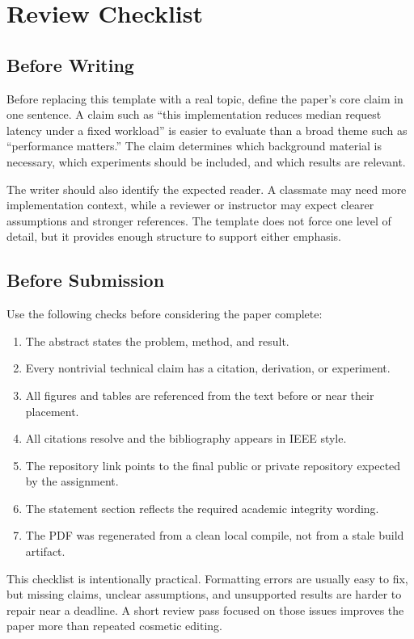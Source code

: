 \section{Review Checklist}

\subsection{Before Writing}

Before replacing this template with a real topic, define the paper's core claim in one sentence. A claim such as ``this implementation reduces median request latency under a fixed workload'' is easier to evaluate than a broad theme such as ``performance matters.'' The claim determines which background material is necessary, which experiments should be included, and which results are relevant.

The writer should also identify the expected reader. A classmate may need more implementation context, while a reviewer or instructor may expect clearer assumptions and stronger references. The template does not force one level of detail, but it provides enough structure to support either emphasis.

\subsection{Before Submission}

Use the following checks before considering the paper complete:
\begin{enumerate}
\item The abstract states the problem, method, and result.
\item Every nontrivial technical claim has a citation, derivation, or experiment.
\item All figures and tables are referenced from the text before or near their placement.
\item All citations resolve and the bibliography appears in IEEE style.
\item The repository link points to the final public or private repository expected by the assignment.
\item The statement section reflects the required academic integrity wording.
\item The PDF was regenerated from a clean local compile, not from a stale build artifact.
\end{enumerate}

This checklist is intentionally practical. Formatting errors are usually easy to fix, but missing claims, unclear assumptions, and unsupported results are harder to repair near a deadline. A short review pass focused on those issues improves the paper more than repeated cosmetic editing.

